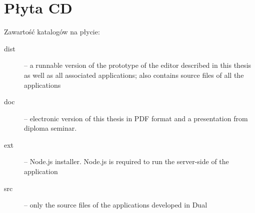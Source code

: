 \chapter{Płyta CD}\label{app:plyta}

\begin{figure}[htb]
\makebox[\textwidth]{\framebox[12.8cm]{\rule{0pt}{12.8cm}}}
\end{figure}
\pagebreak

Zawartość katalogów na płycie:
\begin{description}
\item[dist] -- a runnable version of the prototype of the editor described in this thesis as well as all associated applications; also contains source files of all the applications
\item[doc] -- electronic version of this thesis in PDF format and a presentation from
diploma seminar.
\item[ext] -- Node.js installer. Node.js is required to run the server-side of the application
\item[src] -- only the source files of the applications developed in Dual
\end{description}

